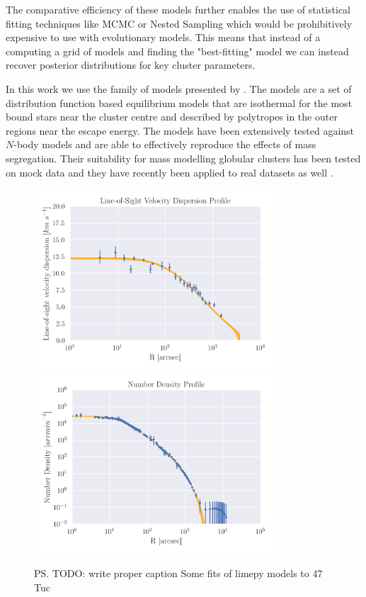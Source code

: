 The comparative efficiency of these models further enables the use of statistical fitting techniques
like MCMC or Nested Sampling which would be prohibitively expensive to use with evolutionary models.
This means that instead of a computing a grid of models and finding the "best-fitting" model we can
instead recover posterior distributions for key cluster parameters.


In this work we use the  family of models presented by \citet{Gieles2015}. The
 models are a set of distribution function based equilibrium models that are isothermal
for the most bound stars near the cluster centre and described by polytropes in the outer regions
near the escape energy. The models have been extensively tested against $N$-body models
\citep{Zocchi2016, Peuten2017} and are able to effectively reproduce the effects of mass
segregation. Their suitability for mass modelling globular clusters has been tested on mock data
\citep{Henault-Brunet2019} and they have recently been applied to real datasets as well
\citep[e.g.][]{Gieles2018, Henault-Brunet2020}.


\begin{figure}
	\centering
	\includegraphics[width=0.8\textwidth]{"./figures/limepy_veldisp.png"}
	\includegraphics[width=0.8\textwidth]{"./figures/limepy_numdens.png"}
	\label{fig:1/limepy_models}
	\caption{\ps{TODO: write proper caption} Some fits of limepy models to 47 Tuc}
\end{figure}


